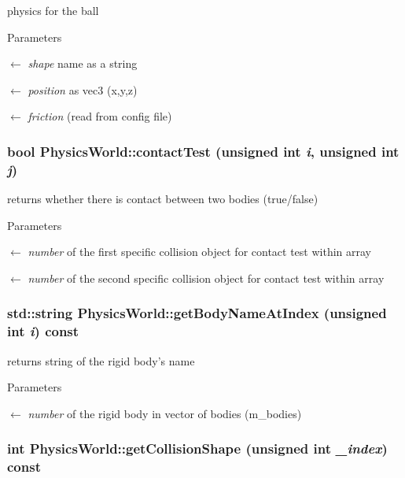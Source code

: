 physics for the ball 
\begin{DoxyParams}{Parameters}
\item[\mbox{$\leftarrow$} {\em shape}]name as a string \item[\mbox{$\leftarrow$} {\em position}]as vec3 (x,y,z) \item[\mbox{$\leftarrow$} {\em friction}](read from config file) \end{DoxyParams}
\hypertarget{classPhysicsWorld_ae3820a8785542fd19563ad1d507bb4d9}{
\subsubsection[{contactTest}]{\setlength{\rightskip}{0pt plus 5cm}bool PhysicsWorld::contactTest (unsigned int {\em i}, \/  unsigned int {\em j})}}
\label{classPhysicsWorld_ae3820a8785542fd19563ad1d507bb4d9}


returns whether there is contact between two bodies (true/false) 
\begin{DoxyParams}{Parameters}
\item[\mbox{$\leftarrow$} {\em number}]of the first specific collision object for contact test within array \item[\mbox{$\leftarrow$} {\em number}]of the second specific collision object for contact test within array \end{DoxyParams}
\hypertarget{classPhysicsWorld_a68a706855bc60f6d404cfbab4ca0d8fa}{
\subsubsection[{getBodyNameAtIndex}]{\setlength{\rightskip}{0pt plus 5cm}std::string PhysicsWorld::getBodyNameAtIndex (unsigned int {\em i}) const}}
\label{classPhysicsWorld_a68a706855bc60f6d404cfbab4ca0d8fa}


returns string of the rigid body's name 
\begin{DoxyParams}{Parameters}
\item[\mbox{$\leftarrow$} {\em number}]of the rigid body in vector of bodies (m\_\-bodies) \end{DoxyParams}
\hypertarget{classPhysicsWorld_aafb952042dbd62fff1de9447557c5b58}{
\subsubsection[{getCollisionShape}]{\setlength{\rightskip}{0pt plus 5cm}int PhysicsWorld::getCollisionShape (unsigned int {\em \_\-index}) const}}
\label{classPhysicsWorld_aafb952042dbd62fff1de9447557c5b58}


